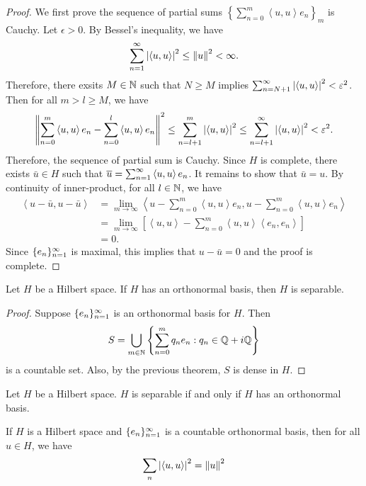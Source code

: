\documentclass[a4paper]{article}
\renewcommand{\braket}[2]{\left\langle #1, #1 \right\rangle}
\begin{document}
\begin{proof}
  We first prove the sequence of partial sums
  $\left\{ \sum_{n=0}^m \braket{u}{e_n} e_n \right\}_m$
  is Cauchy. Let $\epsilon > 0$. By Bessel's inequality,
  we have
  \[
    \suminfn \abs{\braket{u}{e_n}}^2 \leq \norm{u}^2 < \infty.
  \]
  Therefore, there exsits $M \in \mathbb{N}$ such that
  $N \geq M$ implies $\sum_{n=N+1}^\infty \abs{\braket{u}{e_n}}^2
    < \epsilon^2$. Then for all $m > l \geq M$, we have
  \[
    \norm{\sum_{n=0}^m \braket{u}{e_n}e_n -
      \sum_{n=0}^l \braket{u}{e_n}e_n}^2
    \leq \sum_{n=l+1}^m \abs{\braket{u}{e_n}}^2
    \leq \sum_{n=l+1}^\infty \abs{\braket{u}{e_n}}^2
    < \epsilon^2.
  \]
  Therefore, the sequence of partial sum is Cauchy.
  Since $H$ is complete, there exists $\bar{u} \in H$
  such that $\bar{u} = \suminfn \braket{u}{e_n}e_n$.
  It remains to show that $\bar{u} = u$.
  By continuity of inner-product, for all $l \in \mathbb{N}$, we
  have
  \[
    \begin{aligned}
      \braket{u - \bar{u}}{e_l}
       & = \lim_{m \to \infty} \braket{u - \sum_{n=0}^m
                                 \braket{u}{e_n} e_n}{e_l}                                \\
       & = \lim_{m \to \infty} \left[ \braket{u}{e_l}
                                 - \sum_{n=0}^m \braket{u}{e_n} \braket{e_n}{e_l} \right] \\
       & = 0.
    \end{aligned}
  \]
  Since $\{ e_n \}_{n=1}^\infty$ is maximal, this implies that
  $u - \bar{u} = 0$ and the proof is complete.
\end{proof}

\begin{thm}
  Let $H$ be a Hilbert space.
  If $H$ has an orthonormal basis, then
  $H$ is separable.
\end{thm}

\begin{proof}
  Suppose $\{ e_n \}_{n=1}^\infty$ is an orthonormal basis for $H$.
  Then
  \[
    S = \bigcup_{m \in \mathbb{N}} \left\{ \sum_{n=0}^m q_n e_n :
    q_n \in \mathbb{Q} + i \mathbb{Q} \right\}
  \]
  is a countable set.
  Also, by the previous theorem, $S$ is dense in $H$.
\end{proof}

\begin{remark}
  Let $H$ be a Hilbert space. $H$ is separable if and only if
  $H$ has an orthonormal basis.
\end{remark}

\begin{thm}
  If $H$ is a Hilbert space and $\{ e_n \}_{n=1}^\infty$ is a
  countable orthonormal basis, then for all $u \in H$,
  we have
  \[
    \sum_n \abs{\braket{u}{e_n}}^2 = \norm{u}^2
  \]
\end{thm}
\end{document}
